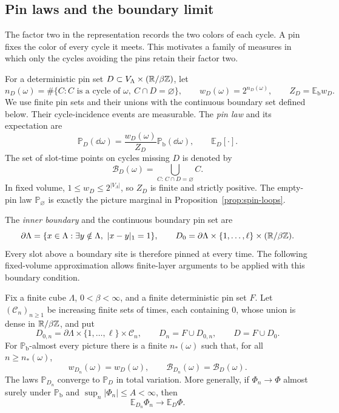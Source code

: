 \subsection{Pin laws and the boundary limit}

The factor two in the representation records the two colors of each
cycle.  A pin fixes the color of every cycle it meets.  This motivates
a family of measures in which only the cycles avoiding the pins
retain their factor two.

For a deterministic pin set
$D\subset V_\Lambda\times(\mathbb R/\beta\mathbb Z)$, let
\[
 n_D(\omega)=\#\{C:C\text{ is a cycle of }\omega,\ C\cap D=\varnothing\},
 \qquad w_D(\omega)=2^{n_D(\omega)},
 \qquad Z_D=\mathbb E_{\mathrm b}w_D.
\]
We use finite pin sets and their unions with the continuous boundary
set defined below.  Their cycle-incidence events are measurable.
The \emph{pin law} and its expectation are
\begin{equation}\label{eq:pin-law}
 \mathbb P_D(\dd\omega)
      =\frac{w_D(\omega)}{Z_D}\mathbb P_{\mathrm b}(\dd\omega),
 \qquad \mathbb E_D[\cdot].
\end{equation}
The set of slot-time points on cycles missing $D$ is denoted by
\[
 \mathcal B_D(\omega)=\bigcup_{C:\,C\cap D=\varnothing}C.
\]
In fixed volume, $1\le w_D\le 2^{|V_\Lambda|}$, so $Z_D$ is finite
and strictly positive.  The empty-pin law $\mathbb P_\varnothing$
is exactly the picture marginal in Proposition~\ref{prop:spin-loops}.

The \emph{inner boundary} and the continuous boundary pin set are
\begin{equation}\label{eq:continuous-boundary-pins}
 \partial\Lambda
    =\{x\in\Lambda:\exists y\notin\Lambda,\ |x-y|_1=1\},
 \qquad
 D_0=\partial\Lambda\times\{1,\ldots,\ell\}
                       \times(\mathbb R/\beta\mathbb Z).
\end{equation}
Every slot above a boundary site is therefore pinned at every time.
The following fixed-volume approximation allows finite-layer
arguments to be applied with this boundary condition.

\begin{lemma}\label{lem:dense-pins}
Fix a finite cube $\Lambda$, $0<\beta<\infty$, and a finite
deterministic pin set $F$.  Let $(\mathcal C_n)_{n\ge1}$ be increasing
finite sets of times, each containing $0$, whose union is dense in
$\mathbb R/\beta\mathbb Z$, and put
\[
 D_{0,n}=\partial\Lambda\times\{1,\ldots,\ell\}\times\mathcal C_n,
 \qquad D_n=F\cup D_{0,n},\qquad D=F\cup D_0.
\]
For $\mathbb P_{\mathrm b}$-almost every picture there is a finite
$n_*(\omega)$ such that, for all $n\ge n_*(\omega)$,
\[
 w_{D_n}(\omega)=w_D(\omega),\qquad
 \mathcal B_{D_n}(\omega)=\mathcal B_D(\omega).
\]
The laws $\mathbb P_{D_n}$ converge to $\mathbb P_D$ in total
variation.  More generally, if $\Phi_n\to\Phi$ almost surely under
$\mathbb P_{\mathrm b}$ and $\sup_n|\Phi_n|\le A<\infty$, then
\begin{equation}\label{eq:dense-pin-expectations}
             \mathbb E_{D_n}\Phi_n\longrightarrow\mathbb E_D\Phi.
\end{equation}
\end{lemma}

